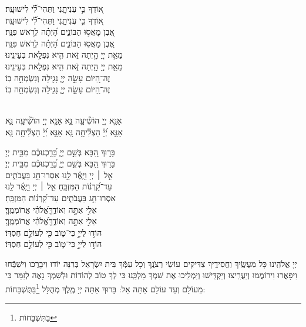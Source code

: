 \documentclass[twoside, openany, parskip=half, 11pt]{book}
\begin{document}
{\begin{narrow}
 א֭וֹדְךָ כִּ֣י עֲנִיתָ֑נִי \hfill וַתְּהִי־לִ֗֝י לִישׁוּעָֽה׃ \\
 \scriptsize{ א֭וֹדְךָ כִּ֣י עֲנִיתָ֑נִי \hfill וַתְּהִי־לִ֗֝י לִישׁוּעָֽה׃ \\}\normalsize{}
 אֶ֭בֶן מָאֲס֣וּ הַבּוֹנִ֑ים \hfill הָ֝יְתָ֗ה לְרֹ֣אשׁ פִּנָּֽה׃ \\
 \scriptsize{ אֶ֭בֶן מָאֲס֣וּ הַבּוֹנִ֑ים \hfill הָ֝יְתָ֗ה לְרֹ֣אשׁ פִּנָּֽה׃ \\}\normalsize{}
 מֵאֵ֣ת יְיָ֭ הָ֣יְתָה זֹּ֑את \hfill הִ֖יא נִפְלָ֣את בְּעֵינֵֽינוּ׃ \\
 \scriptsize{ מֵאֵ֣ת יְיָ֭ הָ֣יְתָה זֹּ֑את \hfill הִ֖יא נִפְלָ֣את בְּעֵינֵֽינוּ׃ \\}\normalsize{}
 זֶה־הַ֭יּוֹם עָשָׂ֣ה יְיָ֑ \hfill נָגִ֖ילָה וְנִשְׂמְחָ֣ה בֽוֹ׃ \\
\scriptsize{ זֶה־הַ֭יּוֹם עָשָׂ֣ה יְיָ֑ \hfill נָגִ֖ילָה וְנִשְׂמְחָ֣ה בֽוֹ׃ } \normalsize{}
 
 
 \\
 אָנָּ֣א יְיָ֭ הוֹשִׁ֘יעָ֥ה נָּ֑א \hfill \scriptsize{אָנָּ֣א יְיָ֭ הוֹשִׁ֘יעָ֥ה נָּ֑א}\\ \normalsize
 אָנָּ֥א יְ֝יָ֗ הַצְלִ֘יחָ֥ה נָּֽא \hfill \scriptsize{ אָנָּ֥א יְ֝יָ֗ הַצְלִ֘יחָ֥ה נָּֽא׃}\\ \normalsize
   

 בָּר֣וּךְ הַ֭בָּא בְּשֵׁ֣ם יְיָ֑  \hfill בֵּ֝רַ֥כְנוּכֶ֗ם מִבֵּ֥ית יְיָ׃\\
\scriptsize{בָּר֣וּךְ הַ֭בָּא בְּשֵׁ֣ם יְיָ֑ \hfill בֵּ֝רַ֥כְנוּכֶ֗ם מִבֵּ֥ית יְיָ׃}\\
\normalsize{אֵ֤ל ׀ יְיָ וַיָּ֢אֶ֫ר לָ֥נוּ \hfill אִסְרוּ־חַ֥ג בַּעֲבֹתִ֑ים \\ עַד־קַ֝רְנ֗וֹת הַמִּזְבֵּֽחַ׃ \hfill }
\scriptsize{אֵ֤ל ׀ יְיָ וַיָּ֢אֶ֫ר לָ֥נוּ \\ אִסְרוּ־חַ֥ג בַּעֲבֹתִ֑ים \hfill עַד־קַ֝רְנ֗וֹת הַמִּזְבֵּֽחַ׃}\\
\normalsize{אֵלִ֣י אַתָּ֣ה וְאוֹדֶ֑ךָּ\hfill  אֱ֝לֹהַ֗י אֲרוֹמְמֶֽךָּ׃}\\
\scriptsize{אֵלִ֣י אַתָּ֣ה וְאוֹדֶ֑ךָּ\hfill  אֱ֝לֹהַ֗י אֲרוֹמְמֶֽךָּ׃}\\
\normalsize{הוֹד֣וּ לַייָ֣ כִּי־ט֑וֹב \hfill כִּ֖י לְעוֹלָ֣ם חַסְדּֽוֹ׃ }\\
\scriptsize{הוֹד֣וּ לַייָ֣ כִּי־ט֑וֹב \hfill כִּ֖י לְעוֹלָ֣ם חַסְדּֽוֹ׃ } \\
\normalsize{}

\end{narrow}

\negline

 יְיָ אֱלֹהֵֽינוּ כָּל מַעֲשֶֽׂיךָ וַחֲסִידֶֽיךָ צַדִּיקִים עוֹשֵׂי רְצֹנֶֽךָ וְכָל עַמְּֿךָ בֵּית יִשְׂרָאֵל בְּרִנָּה יוֹדוּ וִיבָרֲכוּ וִישַׁבְּֿחוּ וִיפָאֲרוּ וִירוֹמֲמוּ וְיַעֲרִֽיצוּ וְיַקְדִּֽישׁוּ וְיַמְלִֽיכוּ אֶת שִׁמְךָ מַלְכֵּֽנוּ  כִּי לְךָ טוֹב לְהוֹדוֹת וּלְשִׁמְךָ נָאֶה לְזַמֵּר כִּי מֵעוֹלָם וְעַד עוֹלָם אַתָּה אֵל: בָּרוּךְ אַתָּה יְיָ מֶֽלֶךְ מְהֻלָּל  \footnote{בַּתִּשְׁבָּחוֹת}בַּתֻּשְׁבָּחוֹת:
}
\end{document}

